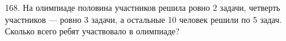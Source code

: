 168. На олимпиаде половина участников решила ровно 2 задачи, четверть участников --- ровно 3 задачи, а остальные 10 человек решили по 5 задач. Сколько всего ребят участвовало в олимпиаде?\\
